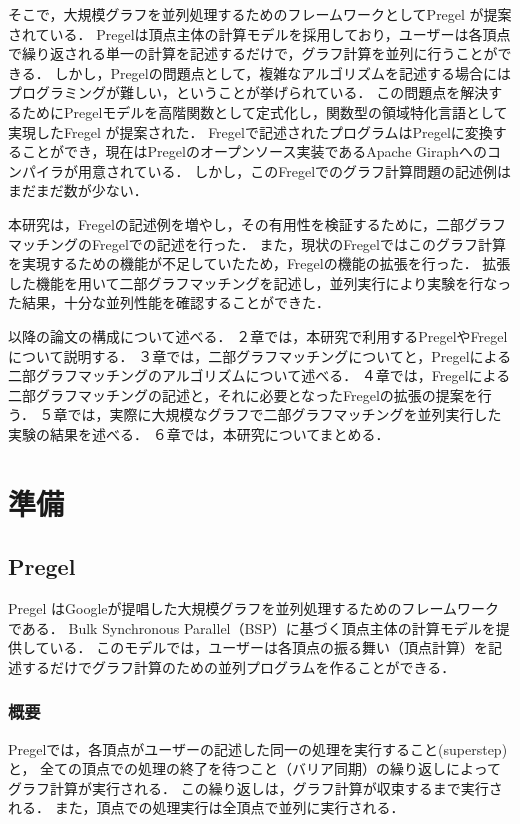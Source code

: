 \documentclass[12pt]{ujreport}
\begin{document}
そこで，大規模グラフを並列処理するためのフレームワークとしてPregel \cite{pregel}が提案されている．
Pregelは頂点主体の計算モデルを採用しており，ユーザーは各頂点で繰り返される単一の計算を記述するだけで，グラフ計算を並列に行うことができる．
しかし，Pregelの問題点として，複雑なアルゴリズムを記述する場合にはプログラミングが難しい，ということが挙げられている．
この問題点を解決するためにPregelモデルを高階関数として定式化し，関数型の領域特化言語として実現したFregel \cite{fregel}が提案された．
Fregelで記述されたプログラムはPregelに変換することができ，現在はPregelのオープンソース実装であるApache Giraphへのコンパイラが用意されている．
しかし，このFregelでのグラフ計算問題の記述例はまだまだ数が少ない．

本研究は，Fregelの記述例を増やし，その有用性を検証するために，二部グラフマッチングのFregelでの記述を行った．
また，現状のFregelではこのグラフ計算を実現するための機能が不足していたため，Fregelの機能の拡張を行った．
拡張した機能を用いて二部グラフマッチングを記述し，並列実行により実験を行なった結果，十分な並列性能を確認することができた．

以降の論文の構成について述べる．
２章では，本研究で利用するPregelやFregelについて説明する．
３章では，二部グラフマッチングについてと，Pregelによる二部グラフマッチングのアルゴリズムについて述べる．
４章では，Fregelによる二部グラフマッチングの記述と，それに必要となったFregelの拡張の提案を行う．
５章では，実際に大規模なグラフで二部グラフマッチングを並列実行した実験の結果を述べる．
６章では，本研究についてまとめる．

\newpage

\chapter{準備}
\section{Pregel}
Pregel \cite{pregel}はGoogleが提唱した大規模グラフを並列処理するためのフレームワークである．
Bulk Synchronous Parallel（BSP）に基づく頂点主体の計算モデルを提供している．
このモデルでは，ユーザーは各頂点の振る舞い（頂点計算）を記述するだけでグラフ計算のための並列プログラムを作ることができる．

\subsection{概要}
Pregelでは，各頂点がユーザーの記述した同一の処理を実行すること(superstep)と，
全ての頂点での処理の終了を待つこと（バリア同期）の繰り返しによってグラフ計算が実行される．
この繰り返しは，グラフ計算が収束するまで実行される．
また，頂点での処理実行は全頂点で並列に実行される．
\end{document}
